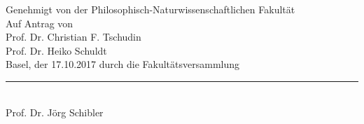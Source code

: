 \restoregeometry
\begin{center}

Genehmigt von der Philosophisch-Naturwissenschaftlichen Fakult\"at\\
Auf Antrag von\\[0.5cm]
Prof. Dr. Christian F. Tschudin\\Prof. Dr. Heiko Schuldt\\[0.5cm]

Basel, der 17.10.2017 durch die Fakult\"atsversammlung\\[2cm]
{\rule{6cm}{0.2pt}\\ Prof. Dr. J\"org Schibler}
\end{center}
\vfill
\begin{abstract}        %
		\myabstract
		
\end{abstract}





